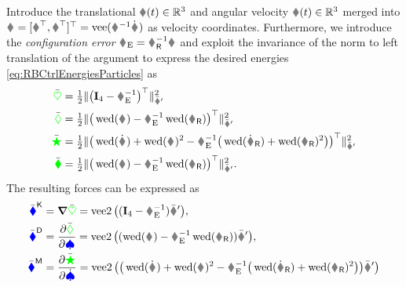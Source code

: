 Introduce the translational $\v(t) \in \RealNum^3$ and angular velocity $\w(t)\in \RealNum^3$ merged into $\bodyVel{}{} = [\v^\top, \w^\top]^\top = \veeOp(\bodyHomoCoord{}{}^{-1} \bodyHomoCoordd{}{})$ as velocity coordinates.
Furthermore, we introduce the \textit{configuration error} $\bodyHomoCoordE{}{} = \bodyHomoCoordR{}{}^{-1} \bodyHomoCoord{}{}$ and exploit the invariance of the norm to left translation of the argument to express the desired energies \eqref{eq:RBCtrlEnergiesParticles} as
\begin{subequations}
\begin{align}
 \potentialEnergyC &= \tfrac{1}{2} \norm[\bodyStiffMatCp{}{}]{\big(\idMat[4] - \bodyHomoCoordE{}{}^{-1}\big)^\top}^2
\\
 \dissFktC &= \tfrac{1}{2} \norm[\bodyDissMatCp{}{}]{\big(\wedOp(\bodyVel{}{}) - \bodyHomoCoordE{}{}^{-1} \wedOp(\bodyVelR{}{}) \big)^\top}^2
\\
 \accEnergyC &= \tfrac{1}{2} \norm[\bodyInertiaMatCp{}{}]{\big(\wedOp(\bodyVeld{}{}) + \wedOp(\bodyVel{}{})^2 - \bodyHomoCoordE{}{}^{-1} \big( \wedOp(\bodyVelRd{}{}) + \wedOp(\bodyVelR{}{})^2 \big)\big)^\top}^2
\\
 \kineticEnergyC &= \tfrac{1}{2} \norm[\bodyInertiaMatCp{}{}]{\big(\wedOp(\bodyVel{}{}) - \bodyHomoCoordE{}{}^{-1} \wedOp(\bodyVelR{}{}) \big)^\top}^2
 .
\end{align}
\end{subequations}
The resulting forces can be expressed as
\begin{subequations}\label{eq:RBCtrlParticles}
\begin{align}
 \genForceStiffC
 &= \differential \potentialEnergyC
 = \veeTwoOp \big( (\idMat[4] - \bodyHomoCoordE{}{}^{-1}) \bodyStiffMatCp{}{} \big),
 \label{eq:GenForceStiffRigidBodyCtrl}
\\
 \genForceDissC
 &= \pdiff[\dissFktC]{\sysVel}
 = \veeTwoOp \big( (\wedOp(\bodyVel{}{}) - \bodyHomoCoordE{}{}^{-1} \wedOp(\bodyVelR{}{})) \bodyDissMatCp{}{} \big),
\\
 \genForceInertiaC
 &= \pdiff[\accEnergyC]{\sysVeld}
 = \veeTwoOp \big( \big(\wedOp(\bodyVeld{}{}) + \wedOp(\bodyVel{}{})^2 - \bodyHomoCoordE{}{}^{-1} \big( \wedOp(\bodyVelRd{}{}) + \wedOp(\bodyVelR{}{})^2 \big) \big) \bodyInertiaMatCp{}{} \big) 
\end{align}
\end{subequations}
